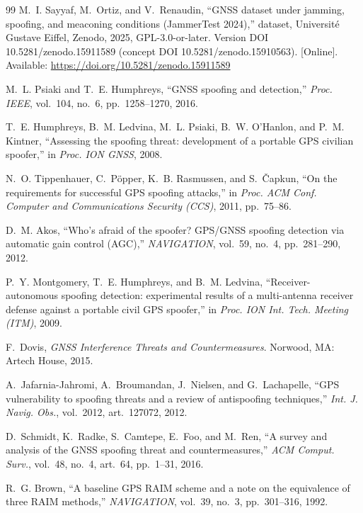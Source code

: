 \documentclass[conference]{IEEEtran}
\begin{document}
\begin{thebibliography}{99}
 M.~I. Sayyaf, M.~Ortiz, and V.~Renaudin, ``GNSS dataset
under jamming, spoofing, and meaconing conditions (JammerTest 2024),'' dataset,
Universit\'e Gustave Eiffel, Zenodo, 2025, GPL-3.0-or-later. Version DOI
10.5281/zenodo.15911589 (concept DOI 10.5281/zenodo.15910563). [Online].
Available: \url{https://doi.org/10.5281/zenodo.15911589}

 M.~L. Psiaki and T.~E. Humphreys, ``GNSS spoofing and detection,''
\emph{Proc. IEEE}, vol.~104, no.~6, pp.~1258--1270, 2016.

 T.~E. Humphreys, B.~M. Ledvina, M.~L. Psiaki, B.~W. O'Hanlon,
and P.~M. Kintner, ``Assessing the spoofing threat: development of a portable GPS
civilian spoofer,'' in \emph{Proc. ION GNSS}, 2008.

 N.~O. Tippenhauer, C.~P\"opper, K.~B. Rasmussen, and
S.~\v{C}apkun, ``On the requirements for successful GPS spoofing attacks,'' in
\emph{Proc. ACM Conf. Computer and Communications Security (CCS)}, 2011,
pp.~75--86.

 D.~M. Akos, ``Who's afraid of the spoofer? GPS/GNSS spoofing
detection via automatic gain control (AGC),'' \emph{NAVIGATION}, vol.~59, no.~4,
pp.~281--290, 2012.

 P.~Y. Montgomery, T.~E. Humphreys, and B.~M. Ledvina,
``Receiver-autonomous spoofing detection: experimental results of a multi-antenna
receiver defense against a portable civil GPS spoofer,'' in \emph{Proc. ION Int.
Tech. Meeting (ITM)}, 2009.

 F.~Dovis, \emph{GNSS Interference Threats and Countermeasures}.
Norwood, MA: Artech House, 2015.

 A.~Jafarnia-Jahromi, A.~Broumandan, J.~Nielsen, and
G.~Lachapelle, ``GPS vulnerability to spoofing threats and a review of
antispoofing techniques,'' \emph{Int. J. Navig. Obs.}, vol.~2012, art.~127072,
2012.

 D.~Schmidt, K.~Radke, S.~Camtepe, E.~Foo, and M.~Ren, ``A
survey and analysis of the GNSS spoofing threat and countermeasures,'' \emph{ACM
Comput. Surv.}, vol.~48, no.~4, art.~64, pp.~1--31, 2016.

 R.~G. Brown, ``A baseline GPS RAIM scheme and a note on the
equivalence of three RAIM methods,'' \emph{NAVIGATION}, vol.~39, no.~3,
pp.~301--316, 1992.


\end{thebibliography}
\end{document}
